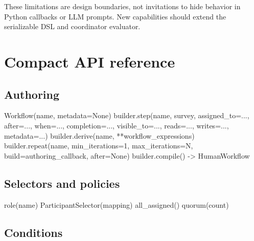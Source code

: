 \documentclass[
  10pt,
]{report}
\newenvironment{Shaded}{}{}
\newcommand{\BuiltInTok}[1]{\textcolor[rgb]{0.00,0.50,0.00}{#1}}
\newcommand{\DecValTok}[1]{\textcolor[rgb]{0.25,0.63,0.44}{#1}}
\newcommand{\NormalTok}[1]{#1}
\newcommand{\OperatorTok}[1]{\textcolor[rgb]{0.40,0.40,0.40}{#1}}
\newcommand{\VariableTok}[1]{\textcolor[rgb]{0.10,0.09,0.49}{#1}}
\begin{document}
These limitations are design boundaries, not invitations to hide
behavior in Python callbacks or LLM prompts. New capabilities should
extend the serializable DSL and coordinator evaluator.

\chapter{Compact API reference}\label{compact-api-reference}

\section{Authoring}\label{authoring}

\begin{Shaded}
\begin{Highlighting}[]
\NormalTok{Workflow(name, metadata}\OperatorTok{=}\VariableTok{None}\NormalTok{)}
\NormalTok{builder.step(name, survey, assigned\_to}\OperatorTok{=}\NormalTok{..., after}\OperatorTok{=}\NormalTok{..., when}\OperatorTok{=}\NormalTok{...,}
\NormalTok{             completion}\OperatorTok{=}\NormalTok{..., visible\_to}\OperatorTok{=}\NormalTok{..., reads}\OperatorTok{=}\NormalTok{..., writes}\OperatorTok{=}\NormalTok{..., metadata}\OperatorTok{=}\NormalTok{...)}
\NormalTok{builder.derive(name, }\OperatorTok{**}\NormalTok{workflow\_expressions)}
\NormalTok{builder.repeat(name, min\_iterations}\OperatorTok{=}\DecValTok{1}\NormalTok{, max\_iterations}\OperatorTok{=}\NormalTok{N,}
\NormalTok{               build}\OperatorTok{=}\NormalTok{authoring\_callback, after}\OperatorTok{=}\VariableTok{None}\NormalTok{)}
\NormalTok{builder.}\BuiltInTok{compile}\NormalTok{() }\OperatorTok{{-}\textgreater{}}\NormalTok{ HumanWorkflow}
\end{Highlighting}
\end{Shaded}

\section{Selectors and policies}\label{selectors-and-policies}

\begin{Shaded}
\begin{Highlighting}[]
\NormalTok{role(name)}
\NormalTok{ParticipantSelector(mapping)}
\NormalTok{all\_assigned()}
\NormalTok{quorum(count)}
\end{Highlighting}
\end{Shaded}

\section{Conditions}\label{conditions}
\end{document}
